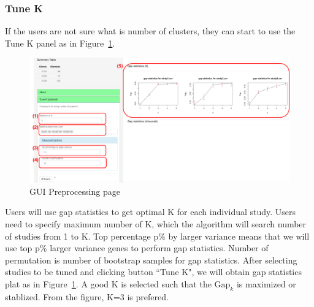 \subsubsection{Tune K}
If the users are not sure what is number of clusters,
they can start to use the Tune K panel as in Figure~\ref{fig:metaClusttuneK}.
\begin{figure}[H]
\begin{center}
\includegraphics[scale=0.35]{./figure/metaClust/tuneK}
\caption{GUI Preprocessing page}
\label{fig:metaClusttuneK}
\end{center}
\end{figure}
Users will use gap statistics to get optimal K for each individual study.
Users need to specify maximum number of K, which the algorithm will search number of studies from 1 to K.
Top percentage p\% by larger variance means that we will use top p\% larger variance genes to perform gap statistics.
Number of permutation is number of bootstrap samples for gap statistics.
After selecting studies to be tuned and clicking button ``Tune K",
we will obtain gap statistics plat as in Figure~\ref{fig:metaClusttuneK}.
A good K is selected such that the $\mbox{Gap}_k$ is maximized or stablized.
From the figure, K=3 is prefered.


